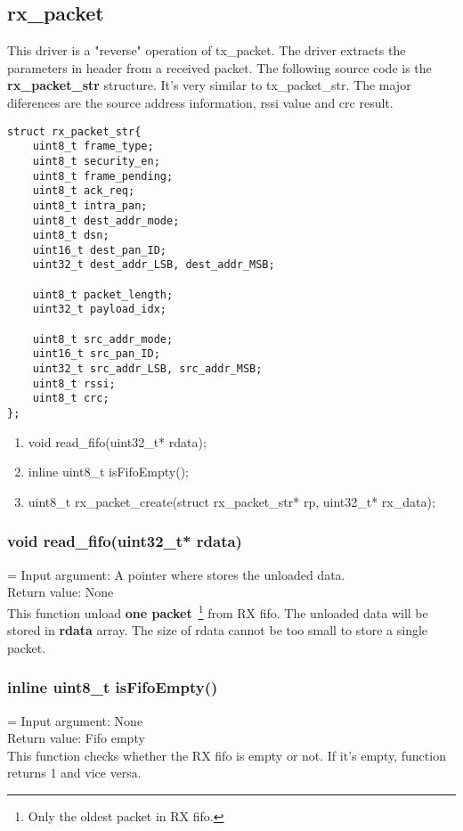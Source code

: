 \subsection{rx\_packet}
This driver is a "reverse" operation of tx\_packet. The driver extracts the parameters in header
from a received packet. The following source code is the {\bf rx\_packet\_str} structure. It's
very similar to tx\_packet\_str. The major diferences are the source address information,
rssi value and crc result.

\begin{lstlisting}[caption=RX Packet Structure]
struct rx_packet_str{
	uint8_t frame_type;
	uint8_t security_en;
	uint8_t frame_pending;
	uint8_t ack_req;
	uint8_t intra_pan;
	uint8_t dest_addr_mode;
	uint8_t dsn;
	uint16_t dest_pan_ID;
	uint32_t dest_addr_LSB, dest_addr_MSB;

	uint8_t packet_length;
	uint32_t payload_idx;

	uint8_t src_addr_mode;
	uint16_t src_pan_ID;
	uint32_t src_addr_LSB, src_addr_MSB;
	uint8_t rssi;
	uint8_t crc;
};
\end{lstlisting}

\begin{enumerate}
	\item void read\_fifo(uint32\_t* rdata);
	\item inline uint8\_t isFifoEmpty();
	\item uint8\_t rx\_packet\_create(struct rx\_packet\_str* rp, uint32\_t* rx\_data);
\end{enumerate}

\subsubsection{void read\_fifo(uint32\_t* rdata)}
\hangindent=\parindent
{}
Input argument: A pointer where stores the unloaded data.\\
Return value: None\\
This function unload {\bf one packet}~\footnote{Only the oldest packet in RX fifo.} from RX fifo. 
The unloaded data will be stored in {\bf rdata} array. The size of rdata cannot be too small to
store a single packet.

\subsubsection{inline uint8\_t isFifoEmpty()}
\hangindent=\parindent
{}
Input argument: None\\
Return value: Fifo empty\\
This function checks whether the RX fifo is empty or not. If it's empty, function returns 1 and
vice versa.

